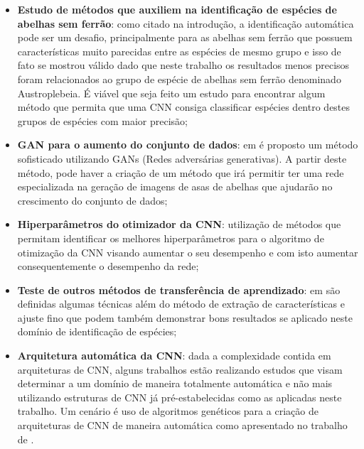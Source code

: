 \documentclass[
	12pt,				%
	oneside,			%
	a4paper,			%
	english,			%
	brazil				%
	]{abntex2ppgsi}
\begin{document}
\begin{itemize}
  \item \textbf{Estudo de métodos que auxiliem na identificação de espécies de abelhas sem ferrão}: como citado na introdução, a identificação automática pode ser um desafio, principalmente para as abelhas sem ferrão que possuem características muito parecidas entre as espécies de mesmo grupo \cite{francoy2010morfometria} e isso de fato se mostrou válido dado que neste trabalho os resultados menos precisos foram relacionados ao grupo de espécie de abelhas sem ferrão denominado Austroplebeia. É viável que seja feito um estudo para encontrar algum método que permita que uma CNN consiga classificar espécies dentro destes grupos de espécies com maior precisão;
  
  \item \textbf{GAN para o aumento do conjunto de dados}: em  é proposto um método sofisticado utilizando GANs (Redes adversárias generativas). A partir deste método, pode haver a criação de um método que irá permitir ter uma rede especializada na geração de imagens de asas de abelhas que ajudarão no crescimento do conjunto de dados;
  
  \item \textbf{Hiperparâmetros do otimizador da CNN}: utilização de métodos que permitam identificar os melhores hiperparâmetros para o algoritmo de otimização da CNN visando aumentar o seu desempenho e com isto aumentar consequentemente o desempenho da rede;
  
  \item \textbf{Teste de outros métodos de transferência de aprendizado}: em  são definidas algumas técnicas além do método de extração de características e ajuste fino que podem também demonstrar bons resultados se aplicado neste domínio de identificação de espécies;
  
  \item \textbf{Arquitetura automática da CNN}: dada a complexidade contida em arquiteturas de CNN, alguns trabalhos estão realizando estudos que visam determinar a um domínio de maneira totalmente automática e não mais utilizando estruturas de CNN já pré-estabelecidas como as aplicadas neste trabalho. Um cenário é uso de algoritmos genéticos para a criação de arquiteturas de CNN de maneira automática como apresentado no trabalho de .
\end{itemize}

\postextual
\end{document}
